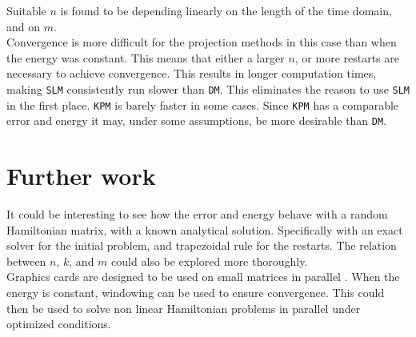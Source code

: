\noindent Suitable $n$ is found to be depending linearly on the length of the time domain, and on $m$.\\%

\noindent Convergence is more difficult for the projection methods in this case than when the energy was constant. This means that either a larger $n$, or more restarts are necessary to achieve convergence. This results in longer computation times,
making \texttt{SLM} consistently run slower than \texttt{DM}. This eliminates the reason to use \texttt{SLM} in the first place. \texttt{KPM} is barely faster in some cases. Since \texttt{KPM} has a comparable error and energy it may, under some assumptions, be more desirable than \texttt{DM}.

\section{Further work}
It could be interesting to see how the error and energy behave with a random Hamiltonian matrix, with a known analytical solution. Specifically with an exact solver for the initial problem, and trapezoidal rule for the restarts. The relation between $n$, $k$, and $m$ could also be explored more thoroughly. \\

\noindent Graphics cards are designed to be used on small matrices in parallel \cite{graphics}. When the energy is constant, windowing can be used to ensure convergence. This could then be used to solve non linear Hamiltonian problems in parallel under optimized conditions. \\
